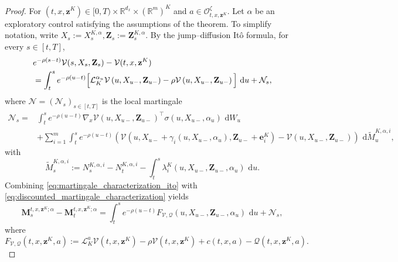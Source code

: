 \documentclass[11pt]{article}
\theoremstyle{remarkitalic}
\theoremstyle{remarkitalic}
\newcommand{\dd}{\,\mathrm d}
\newcommand{\1}{\mathbf 1}
\begin{document}
\begin{proof}
For $(t,x,\mathbf z^K)
    \in
    [0,T)\times
    \mathbb R^{d_x}\times(\mathbb R^m)^K$
and $a\in\mathcal O^\zeta_{t,x,\mathbf z^K}$.
Let $\alpha$ be an exploratory control satisfying the assumptions
of the theorem. To simplify notation, write $X_s:=X_s^{K,\alpha},
    \mathbf Z_s:=\mathbf Z_s^{K,\alpha}.$
By the jump--diffusion It\^o formula, for every $s\in[t,T]$,
\begin{align}
\label{eq:martingale_characterization_ito}
    &
    e^{-\rho(s-t)}
    \mathcal V(s,X_s,\mathbf Z_s)
    -
    \mathcal V(t,x,\mathbf z^K)
    \notag\\
    &=
    \int_t^s
    e^{-\rho(u-t)}
    \Big[
        \mathcal L_K^{\alpha_u}
        \mathcal V
        \left(
            u,X_{u-},\mathbf Z_{u-}
        \right)
        -
        \rho
        \mathcal V
        \left(
            u,X_{u-},\mathbf Z_{u-}
        \right)
    \Big]
    \,\dd u
    +
    \mathcal N_s,
\end{align}
where $\mathcal N=(\mathcal N_s)_{s\in[t,T]}$ is the local martingale
\begin{align*}
    \mathcal N_s
    ={}&
    \int_t^s
    e^{-\rho(u-t)}
    \nabla_x\mathcal V
    \left(
        u,X_{u-},\mathbf Z_{u-}
    \right)^\top
    \sigma
    \left(
        u,X_{u-},\alpha_u
    \right)
    \,\dd W_u
    \\
    &+
    \sum_{i=1}^m
    \int_t^s
    e^{-\rho(u-t)}
    \left(\mathcal V
    \left(
        u,
        X_{u-}+\gamma_i(u,X_{u-},\alpha_u),
        \mathbf Z_{u-}+\mathbf e_i^K
    \right)-
    \mathcal V(u,X_{u-},\mathbf Z_{u-})\right)
    \,\dd\widetilde M_u^{K,\alpha,i},
\end{align*}
with
\[
    \widetilde M_s^{K,\alpha,i}
    :=
    N_s^{K,\alpha,i}
    -
    N_t^{K,\alpha,i}
    -
    \int_t^s
    \lambda_i^K
    \left(
        u,X_{u-},\mathbf Z_{u-},\alpha_u
    \right)
    \,\dd u.
\] Combining
\eqref{eq:martingale_characterization_ito} with
\eqref{eq:discounted_martingale_characterization} yields
\[
    \mathbf M_s^{t,x,\mathbf z^K;\alpha}
    -
    \mathbf M_t^{t,x,\mathbf z^K;\alpha}
    =
    \int_t^s
    e^{-\rho(u-t)}
    F_{\mathcal V,\mathcal Q}
    \left(
        u,X_{u-},\mathbf Z_{u-},\alpha_u
    \right)
    \,\dd u+\mathcal N_s,
\] where 
\begin{equation*}
    F_{\mathcal V,\mathcal Q}
    (t,x,\mathbf z^K,a):=
    \mathcal L_K^a
    \mathcal V(t,x,\mathbf z^K)
    -
    \rho\mathcal V(t,x,\mathbf z^K)
    +
    c(t,x,a)
    -
    \mathcal Q(t,x,\mathbf z^K,a).

\end{equation*}
\end{proof}
\end{document}
